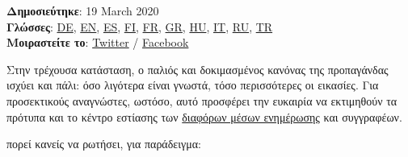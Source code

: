 \textbf{Δημοσιεύτηκε}: 19 March 2020\\
\textbf{Γλώσσες}:
\href{https://swprs.org/corona-medien-propaganda/}{DE},
\href{https://swprs.org/corona-media-propaganda/}{EN},
\href{http://piensachile.com/2020/03/corona-medios-de-comunicacion-propaganda/}{ES},
\href{https://swprs.org/koronasta-mediasta-ja-propagandasta/}{FI},
\href{https://swprs.org/sur-le-coronavirus-les-medias-et-la-propagande/}{FR},
\href{https://swprs.org/corona-media-propaganda-greek/}{GR},
\href{https://swprs.org/korona-media-propaganda/}{HU},
\href{https://swprs.org/corona-media-propaganda-it/}{IT},
\href{https://swprs.org/\%d0\%be-\%d0\%ba\%d0\%be\%d1\%80\%d0\%be\%d0\%bd\%d0\%b0\%d0\%b2\%d0\%b8\%d1\%80\%d1\%83\%d1\%81\%d0\%b5-\%d1\%81\%d0\%bc\%d0\%b8-\%d0\%b8-\%d0\%bf\%d1\%80\%d0\%be\%d0\%bf\%d0\%b0\%d0\%b3\%d0\%b0\%d0\%bd\%d0\%b4\%d0\%b5/}{RU},
\href{https://swprs.org/korona-medya-ve-propaganda-uezerine/}{TR}\\
\textbf{Μοιραστείτε το}:
\href{https://twitter.com/intent/tweet?url=https://swprs.org/corona-media-propaganda-greek/}{Twitter}
/
\href{https://www.facebook.com/share.php?u=https://swprs.org/corona-media-propaganda-greek/}{Facebook}

Στην τρέχουσα κατάσταση, ο παλιός και δοκιμασμένος κανόνας της
προπαγάνδας ισχύει και πάλι: όσο λιγότερα είναι γνωστά, τόσο
περισσότερες οι εικασίες. Για προσεκτικούς αναγνώστες, ωστόσο, αυτό
προσφέρει την ευκαιρία να εκτιμηθούν τα πρότυπα και το κέντρο εστίασης
των \href{https://swprs.org/media-navigator/}{διαφόρων μέσων ενημέρωσης}
και συγγραφέων.

πορεί κανείς να ρωτήσει, για παράδειγμα:

